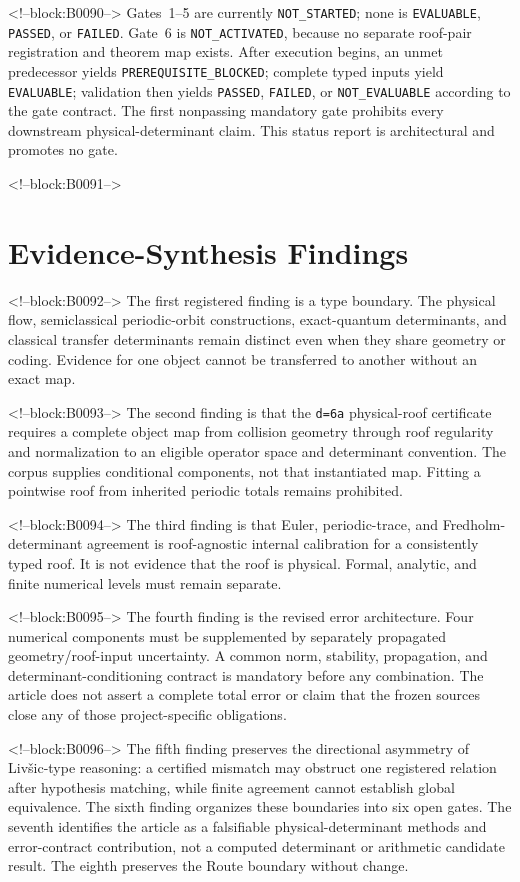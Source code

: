 \documentclass[11pt,a4paper]{article}
\begin{document}
<!--block:B0090-->
Gates~1--5 are currently \texttt{NOT\_\allowbreak STARTED}; none is
\texttt{EVALUABLE}, \texttt{PASSED}, or \texttt{FAILED}.  Gate~6 is
\texttt{NOT\_\allowbreak ACTIVATED}, because no separate roof-pair registration and theorem
map exists.  After execution begins, an unmet predecessor yields
\texttt{PREREQUISITE\_\allowbreak BLOCKED}; complete typed inputs yield
\texttt{EVALUABLE}; validation then yields \texttt{PASSED},
\texttt{FAILED}, or \texttt{NOT\_\allowbreak EVALUABLE} according to the gate contract.
The first nonpassing mandatory gate prohibits every downstream
physical-determinant claim.  This status report is architectural and promotes
no gate.

<!--block:B0091-->
\section{Evidence-Synthesis Findings}

<!--block:B0092-->
The first registered finding is a type boundary. The physical flow, semiclassical periodic-orbit constructions, exact-quantum determinants, and classical transfer determinants remain distinct even when they share geometry or coding. Evidence for one object cannot be transferred to another without an exact map.

<!--block:B0093-->
The second finding is that the \texttt{d=6a} physical-roof certificate requires a complete object map from collision geometry through roof regularity and normalization to an eligible operator space and determinant convention. The corpus supplies conditional components, not that instantiated map. Fitting a pointwise roof from inherited periodic totals remains prohibited.

<!--block:B0094-->
The third finding is that Euler, periodic-trace, and Fredholm-determinant agreement is roof-agnostic internal calibration for a consistently typed roof. It is not evidence that the roof is physical. Formal, analytic, and finite numerical levels must remain separate.

<!--block:B0095-->
The fourth finding is the revised error architecture. Four numerical components must be supplemented by separately propagated geometry/roof-input uncertainty. A common norm, stability, propagation, and determinant-conditioning contract is mandatory before any combination. The article does not assert a complete total error or claim that the frozen sources close any of those project-specific obligations.

<!--block:B0096-->
The fifth finding preserves the directional asymmetry of Livšic-type reasoning: a certified mismatch may obstruct one registered relation after hypothesis matching, while finite agreement cannot establish global equivalence. The sixth finding organizes these boundaries into six open gates. The seventh identifies the article as a falsifiable physical-determinant methods and error-contract contribution, not a computed determinant or arithmetic candidate result. The eighth preserves the Route boundary without change.
\end{document}
